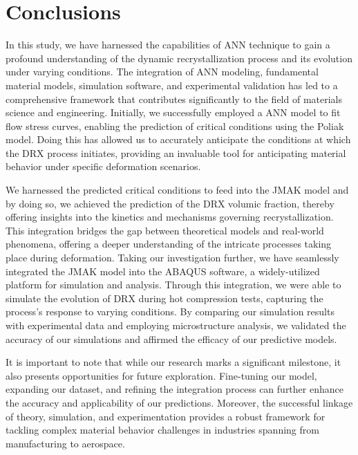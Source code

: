 \documentclass[metals,article,submit,pdftex,moreauthors]{Definitions/mdpi}
\begin{document}
\section{Conclusions\label{sec:Conclusions}}
In this study, we have harnessed the capabilities of ANN technique to gain a profound understanding of the dynamic recrystallization process and its evolution under varying conditions. The integration of ANN modeling, fundamental material models, simulation software, and experimental validation has led to a comprehensive framework that contributes significantly to the field of materials science and engineering. Initially, we successfully employed a ANN model to fit flow stress curves, enabling the prediction of critical conditions using the Poliak model. Doing this has allowed us to accurately anticipate the conditions at which the DRX process initiates, providing an invaluable tool for anticipating material behavior under specific deformation scenarios.

We harnessed the predicted critical conditions to feed into the JMAK model and by doing so, we achieved the prediction of the DRX volumic fraction, thereby offering insights into the kinetics and mechanisms governing recrystallization. This integration bridges the gap between theoretical models and real-world phenomena, offering a deeper understanding of the intricate processes taking place during deformation. Taking our investigation further, we have seamlessly integrated the JMAK model into the ABAQUS software, a widely-utilized platform for simulation and analysis. Through this integration, we were able to simulate the evolution of DRX during hot compression tests, capturing the process's response to varying conditions. By comparing our simulation results with experimental data and employing microstructure analysis, we validated the accuracy of our simulations and affirmed the efficacy of our predictive models.

It is important to note that while our research marks a significant milestone, it also presents opportunities for future exploration. Fine-tuning our model, expanding our dataset, and refining the integration process can further enhance the accuracy and applicability of our predictions. Moreover, the successful linkage of theory, simulation, and experimentation provides a robust framework for tackling complex material behavior challenges in industries spanning from manufacturing to aerospace. 
\end{document}
